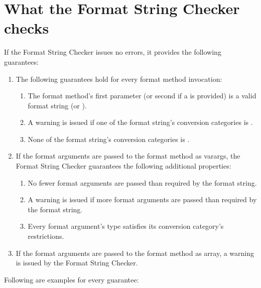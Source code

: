 \section{What the Format String Checker checks\label{formatter-guarantees}}

If the Format String Checker issues no errors, it provides the following guarantees:

\begin{enumerate}
\item
The following guarantees hold for every format method invocation:

\begin{enumerate} 
    \item The format method's first parameter (or second if a  is provided) is a valid
        format string (or ).

    \item A warning is issued if one of the format string's conversion categories is .
        \label{formatter-unused-category-warning}
    \item None of the format string's conversion categories is .
        \label{formatter-null-category-error}
\end{enumerate} 

\item If the format arguments are passed to the format method as varargs, the
Format String Checker guarantees the following additional properties:

\begin{enumerate} 
\item No fewer format arguments are passed than required by the format string.
\item A warning is issued if more format arguments are passed than required by the format string.
\item Every format argument's type satisfies its conversion category's restrictions.
\end{enumerate}

\item If the format arguments are passed to the format method as array, 
a warning is issued by the Format String Checker.
        \label{formatter-array-warning}
\end{enumerate}


\noindent Following are examples for every guarantee:

